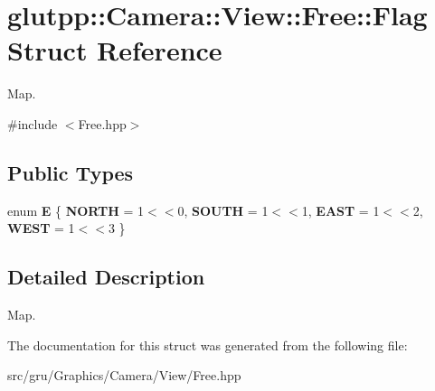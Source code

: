 \hypertarget{structglutpp_1_1Camera_1_1View_1_1Free_1_1Flag}{\section{glutpp\-:\-:\-Camera\-:\-:\-View\-:\-:\-Free\-:\-:\-Flag \-Struct \-Reference}
\label{structglutpp_1_1Camera_1_1View_1_1Free_1_1Flag}
}


\-Map.  




{\ttfamily \#include $<$\-Free.\-hpp$>$}

\subsection*{\-Public \-Types}
\begin{DoxyCompactItemize}
\item 
enum {\bfseries \-E} \{ {\bfseries \-N\-O\-R\-T\-H} =  1$<$$<$0, 
{\bfseries \-S\-O\-U\-T\-H} =  1$<$$<$1, 
{\bfseries \-E\-A\-S\-T} =  1$<$$<$2, 
{\bfseries \-W\-E\-S\-T} =  1$<$$<$3
 \}
\end{DoxyCompactItemize}


\subsection{\-Detailed \-Description}
\-Map. 

\-The documentation for this struct was generated from the following file\-:\begin{DoxyCompactItemize}
\item 
src/gru/\-Graphics/\-Camera/\-View/\-Free.\-hpp\end{DoxyCompactItemize}
